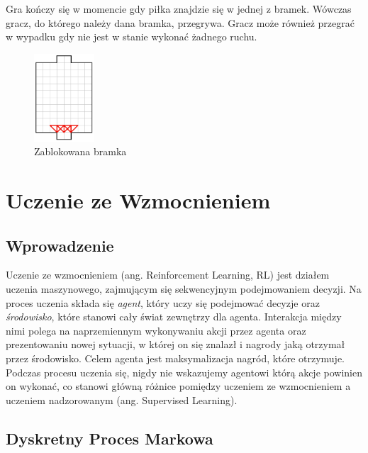\documentclass[licencjacka]{pracamgr}
\begin{document}
Gra kończy się w momencie gdy piłka znajdzie się w jednej z bramek.
Wówczas gracz, do którego należy dana bramka, przegrywa. 
Gracz może również przegrać w wypadku gdy nie jest w stanie wykonać żadnego ruchu.


\begin{figure}[ht]
  \centering
  \includegraphics[width=0.2\textwidth]{zablokowanie}
  \caption{Zablokowana bramka}
\end{figure}
 
\chapter{Uczenie ze Wzmocnieniem}\label{r:rl}

\section{Wprowadzenie}

Uczenie ze wzmocnieniem (ang. Reinforcement Learning, RL) jest działem uczenia maszynowego, zajmującym się sekwencyjnym podejmowaniem decyzji. Na proces uczenia składa się \emph{agent}, który uczy się podejmować decyzje oraz \emph{środowisko}, które stanowi cały świat zewnętrzy dla agenta. Interakcja między nimi polega na naprzemiennym wykonywaniu akcji przez agenta oraz prezentowaniu nowej sytuacji, w której on się znalazł i nagrody jaką otrzymał przez środowisko. Celem agenta jest maksymalizacja nagród, które otrzymuje.
Podczas procesu uczenia się, nigdy nie wskazujemy agentowi którą akcje powinien on wykonać, co stanowi główną różnice pomiędzy uczeniem ze wzmocnieniem a uczeniem nadzorowanym (ang. Supervised Learning). 

\section{Dyskretny Proces Markowa}
\end{document}
